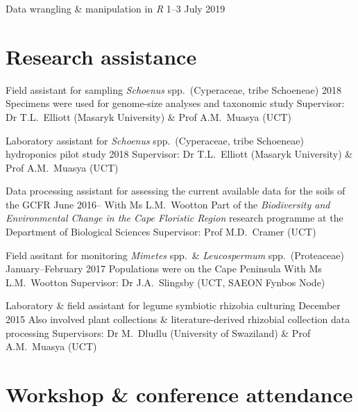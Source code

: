 \documentclass[10pt]{article}
\begin{document}
Data wrangling \& manipulation in \textit{R}      \hfill 1--3 July 2019

\section*{Research assistance} %

\begin{hangparas}{2em}{1}

Field assistant for sampling \textit{Schoenus} spp.~(Cyperaceae, tribe 
Schoeneae)                                           \hfill 2018 \break
Specimens were used for genome-size analyses and taxonomic study \break
Supervisor: Dr T.L.~Elliott (Masaryk University) \& Prof A.M.~Muasya (UCT)

Laboratory assistant for \textit{Schoenus} spp.~(Cyperaceae, tribe Schoeneae) 
hydroponics pilot study                              \hfill 2018 \break
Supervisor: Dr T.L.~Elliott (Masaryk University) \& Prof A.M.~Muasya (UCT)

Data processing assistant for assessing the current available data for the 
soils of the GCFR                             \hfill June 2016-- \break
With Ms L.M.~Wootton \break
Part of the \textit{Biodiversity and Environmental Change in the Cape Floristic 
Region} research programme at the Department of Biological Sciences \break
Supervisor: Prof M.D.~Cramer (UCT)

Field assitant for monitoring \textit{Mimetes} spp.~\& \textit{Leucospermum} 
spp.~(Proteaceae)                  \hfill January--February 2017 \break
Populations were on the Cape Peninsula \break
With Ms L.M.~Wootton \break
Supervisor: Dr J.A.~Slingsby (UCT, SAEON Fynbos Node)

Laboratory \& field assistant for legume symbiotic rhizobia culturing
                                            \hfill December 2015 \break
Also involved plant collections \& literature-derived rhizobial collection 
data processing \break
Supervisors: Dr M.~Dludlu (University of Swaziland) \& Prof A.M.~Muasya (UCT)


\hfill

\end{hangparas}

\section*{Workshop \& conference attendance} %
\end{document}
